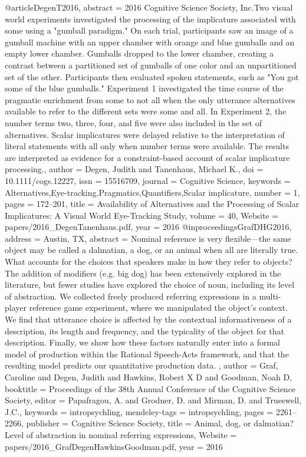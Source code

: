 @article{DegenT2016,
abstract = {{\textcopyright} 2016 Cognitive Science Society, Inc.Two visual world experiments investigated the processing of the implicature associated with some using a "gumball paradigm." On each trial, participants saw an image of a gumball machine with an upper chamber with orange and blue gumballs and an empty lower chamber. Gumballs dropped to the lower chamber, creating a contrast between a partitioned set of gumballs of one color and an unpartitioned set of the other. Participants then evaluated spoken statements, such as "You got some of the blue gumballs." Experiment 1 investigated the time course of the pragmatic enrichment from some to not all when the only utterance alternatives available to refer to the different sets were some and all. In Experiment 2, the number terms two, three, four, and five were also included in the set of alternatives. Scalar implicatures were delayed relative to the interpretation of literal statements with all only when number terms were available. The results are interpreted as evidence for a constraint-based account of scalar implicature processing.},
author = {Degen, Judith and Tanenhaus, Michael K.},
doi = {10.1111/cogs.12227},
issn = {15516709},
journal = {Cognitive Science},
keywords = {Alternatives,Eye-tracking,Pragmatics,Quantifiers,Scalar implicature},
number = {1},
pages = {172--201},
title = {{Availability of Alternatives and the Processing of Scalar Implicatures: A Visual World Eye-Tracking Study}},
volume = {40},
Website = {papers/2016_DegenTanenhaus.pdf},
year = {2016}
}
@inproceedings{GrafDHG2016,
address = {Austin, TX},
abstract = {Nominal reference is very flexible—the same object may be called a dalmatian, a dog, or an animal when all are literally true. What accounts for the choices that speakers make in how they refer to objects? The addition of modifiers (e.g. big dog) has been extensively explored in the literature, but fewer studies have explored the choice of noun, including its level of abstraction. We collected freely produced referring expressions in a multi-player reference game experiment, where we manipulated the object’s context. We find that utterance choice is affected by the contextual informativeness of a description, its length and frequency, and the typicality of the object for that description. Finally, we show how these factors naturally enter into a formal model of production within the Rational Speech-Acts framework, and that the resulting model predicts our quantitative production data. },
author = {Graf, Caroline and Degen, Judith and Hawkins, Robert X D and Goodman, Noah D},
booktitle = {Proceedings of the 38th Annual Conference of the Cognitive Science Society},
editor = {Papafragou, A. and Grodner, D. and Mirman, D. and Trueswell, J.C.},
keywords = {intropsychling},
mendeley-tags = {intropsychling},
pages = {2261--2266},
publisher = {Cognitive Science Society},
title = {{Animal, dog, or dalmatian? Level of abstraction in nominal referring expressions}},
Website = {papers/2016_GrafDegenHawkinsGoodman.pdf},
year = {2016}
}
